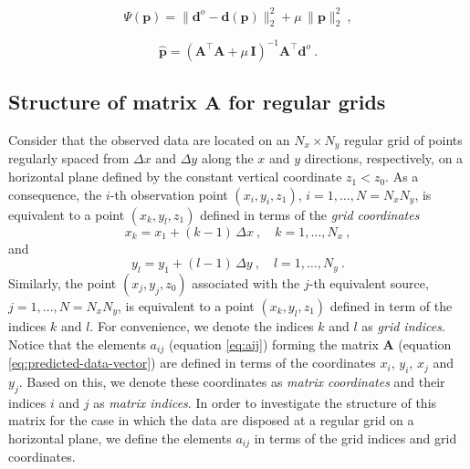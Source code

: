 \documentclass[manuscript,revised]{geophysics}
\begin{document}
\begin{equation}
\Psi(\mathbf{p}) = \| \mathbf{d}^{o} - \mathbf{d(p)} \|_{2}^{2} + 
\mu \, \| \mathbf{p} \|_{2}^{2} \: ,
\label{eq:goal-function}
\end{equation}

\begin{equation}
\hat{\mathbf{p}} = \left( \mathbf{A}^{\top}\mathbf{A} + 
\mu \, \mathbf{I} \right)^{-1}
\mathbf{A}^{\top} \mathbf{d}^{o} \: .
\label{eq:estimated-p-parameter-space}
\end{equation}


\subsection{Structure of matrix $\mathbf{A}$ for regular grids}

Consider that the observed data are located on an $N_{x} \times N_{y}$ regular grid of
points regularly spaced from $\Delta x$ and $\Delta y$ along the $x$ and $y$ directions,
respectively, on a horizontal plane defined by the constant vertical coordinate $z_{1} < z_{0}$. 
As a consequence, the $i$-th observation point $(x_{i}, y_{i}, z_{1})$, $i = 1, \dots, N = N_{x} N_{y}$, 
is equivalent to a point $(x_{k}, y_{l}, z_{1})$ defined in terms of the \textit{grid coordinates}
\begin{equation}
x_{k} = x_{1} + (k - 1) \, \Delta x \: , \quad k = 1, \dots, N_{x} \: ,
\label{eq:xk}
\end{equation}
and
\begin{equation}
y_{l} = y_{1} + (l - 1) \, \Delta y \: , \quad l = 1, \dots, N_{y} \: .
\label{eq:yl}
\end{equation}
Similarly, the point $(x_{j}, y_{j}, z_{0})$ associated with the $j$-th equivalent source,
$j = 1, \dots, N = N_{x}N_{y}$, is equivalent to a point $(x_{k}, y_{l}, z_{1})$ defined
in term of the indices $k$ and $l$.
For convenience, we denote the indices $k$ and $l$ as \textit{grid indices}.
Notice that the elements $a_{ij}$ (equation \ref{eq:aij}) forming the matrix 
$\mathbf{A}$ (equation \ref{eq:predicted-data-vector}) are defined in terms of the 
coordinates $x_{i}$, $y_{i}$, $x_{j}$ and $y_{j}$.
Based on this, we denote these coordinates as \textit{matrix coordinates} and their 
indices $i$ and $j$ as \textit{matrix indices}.
In order to investigate the structure of this matrix for the case in which the data are disposed at a 
regular grid on a horizontal plane, we define the elements $a_{ij}$ in terms of
the grid indices and grid coordinates.
\end{document}
